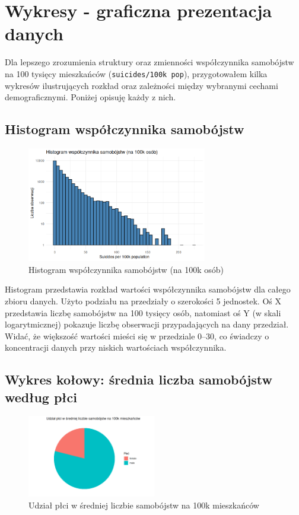\documentclass[polish]{article}
\begin{document}
    \newpage

    \section{Wykresy - graficzna prezentacja danych}

    Dla lepszego zrozumienia struktury oraz zmienności współczynnika samobójstw na 100 tysięcy mieszkańców (\texttt{suicides/100k pop}), przygotowałem kilka wykresów ilustrujących rozkład oraz zależności między wybranymi cechami demograficznymi. Poniżej opisuję każdy z nich.

    \subsection{Histogram współczynnika samobójstw}

    \begin{figure}[H]
    \centering
    \includegraphics[width=0.7\textwidth]{img/histogram.png}
    \caption{Histogram współczynnika samobójstw (na 100k osób)}
    \end{figure}

    Histogram przedstawia rozkład wartości współczynnika samobójstw dla całego zbioru danych. Użyto podziału na przedziały o szerokości 5 jednostek. Oś X przedstawia liczbę samobójstw na 100 tysięcy osób, natomiast oś Y (w skali logarytmicznej) pokazuje liczbę obserwacji przypadających na dany przedział. Widać, że większość wartości mieści się w przedziale 0–30, co świadczy o koncentracji danych przy niskich wartościach współczynnika.

    \subsection{Wykres kołowy: średnia liczba samobójstw według płci}

    \begin{figure}[H]
    \centering
    \includegraphics[width=0.5\textwidth]{img/pie_sex.png}
    \caption{Udział płci w średniej liczbie samobójstw na 100k mieszkańców}
    \end{figure}
\end{document}
